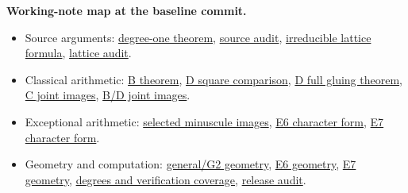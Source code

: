 \documentclass[11pt,letterpaper]{article}
\newcommand{\repo}{https://github.com/sean-rogers-t/Sage-programs/blob/e9fcb7f3b7d28bea9c248abab1f01d8de28250aa/}
\newcommand{\record}[2]{\href{\repo#1}{#2}}
\begin{document}
\noindent\textbf{Working-note map at the baseline commit.}
\begin{itemize}\small
\item Source arguments: \record{borel/TRACE_SOURCE_THEOREM.md}{degree-one theorem},
\record{borel/TRACE_SOURCE_AUDIT.md}{source audit},
\record{borel/IRREDUCIBLE_CHARACTER_LATTICES.md}{irreducible lattice formula},
\record{borel/IRREDUCIBLE_LATTICE_AUDIT.md}{lattice audit}.
\item Classical arithmetic:
\record{borel/TYPE_B_GENERAL_SMITH.md}{B theorem},
\record{borel/TYPE_D_SQUARE_THEOREM.md}{D square comparison},
\record{borel/TYPE_D_EVEN_GLUING_THEOREM.md}{D full gluing theorem},
\record{borel/TYPE_C_JOINT_PRIMITIVITY.md}{C joint images},
\record{borel/ORTHOGONAL_JOINT_IMAGES.md}{B/D joint images}.
\item Exceptional arithmetic:
\record{borel/EXCEPTIONAL_MINUSCULE.md}{selected minuscule images},
\record{borel/E6_CHARACTER_FORM.md}{E6 character form},
\record{borel/E7_CHARACTER_FORM.md}{E7 character form}.
\item Geometry and computation:
\record{borel/SPRINGER_GEOMETRY.md}{general/G2 geometry},
\record{borel/E6_GEOMETRY.md}{E6 geometry},
\record{borel/E7_GEOMETRY.md}{E7 geometry},
\record{borel/EXCEPTIONAL_DEGREES.md}{degrees and verification coverage},
\record{borel/release-0.20-verification.json}{release audit}.
\end{itemize}
\end{document}
